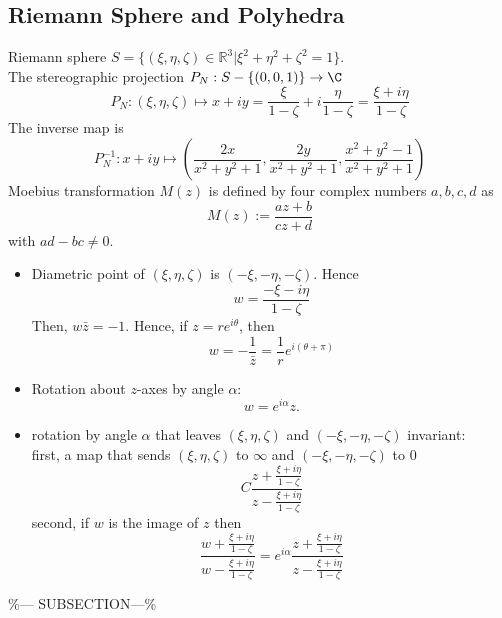 \documentclass{article}
\begin{document}
\subsection{Riemann Sphere and Polyhedra}
\label{sec-2-3}
Riemann sphere $S=\{(\xi,\eta,\zeta)\in \mathbb{R}^3| \xi^2 +\eta^2+\zeta^2 = 1\}$. \\
The stereographic projection $P_{N}:S-\{(0,0,1)\} \rightarrow \C$
\begin{equation}
\label{}
P_{N}:(\xi,\eta,\zeta) \mapsto x+iy = \frac{\xi}{1-\zeta} + i\frac{\eta}{1-\zeta} = \frac{\xi+i\eta}{1-\zeta}
\end{equation}
The inverse map is
\begin{equation}
\label{}
P_{N}^{-1}: x+iy \mapsto \left(\frac{2x}{x^2+y^2+1},\frac{2y}{x^2+y^2+1},\frac{x^2+y^2-1}{x^2+y^2+1} \right)
\end{equation}
Moebius transformation $M(z)$ is defined by four complex numbers $a,b,c,d$ as
\begin{equation}
\label{}
M(z) := \frac{az+b}{cz+d}
\end{equation}
with $ad -bc \ne 0$.\\

\begin{itemize}
  \item 
  Diametric point of $(\xi,\eta,\zeta)$ is $(-\xi,-\eta,-\zeta)$. Hence
\begin{equation}
\label{}
w = \frac{-\xi-i\eta}{1-\zeta}
\end{equation}
Then, $w\bar z = -1$. Hence, if $z = re^{i\theta}$, then
\begin{equation}
\label{}
w = -\frac{1}{\bar z} = \frac{1}{r}e^{i(\theta + \pi)}
\end{equation}
  \item 
  Rotation about $z$-axes by angle $\alpha$:
\begin{equation}
\label{}
w = e^{i\alpha} z.
\end{equation}
  \item rotation by angle $\alpha$ that leaves $(\xi,\eta,\zeta)$ and $(-\xi,-\eta,-\zeta)$ invariant:\\
first, a map that sends $(\xi,\eta,\zeta)$ to $\infty$ and $(-\xi,-\eta,-\zeta)$ to $0$
\begin{equation}
\label{}
C\frac{z + \frac{\xi+i\eta}{1-\zeta}}{z - \frac{\xi+i\eta}{1-\zeta}}
\end{equation}
second, if $w$ is the image of $z$ then
 \begin{equation}
\label{}
\frac{w + \frac{\xi+i\eta}{1-\zeta}}{w - \frac{\xi+i\eta}{1-\zeta}} = e^{i\alpha}\frac{z + \frac{\xi+i\eta}{1-\zeta}}{z - \frac{\xi+i\eta}{1-\zeta}}
\end{equation}

\end{itemize}
\%--- SUBSECTION---\%
\end{document}
